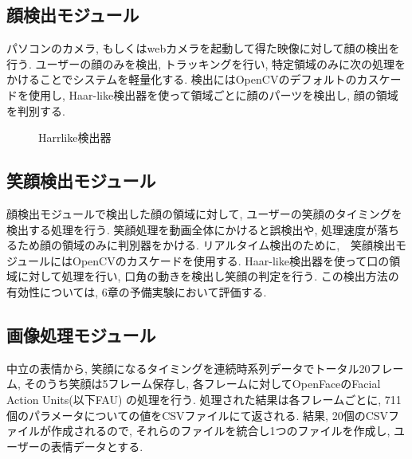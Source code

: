\subsection{顔検出モジュール}
パソコンのカメラ, もしくはwebカメラを起動して得た映像に対して顔の検出を行う.
ユーザーの顔のみを検出, トラッキングを行い, 特定領域のみに次の処理をかけることでシステムを軽量化する.
検出にはOpenCVのデフォルトのカスケードを使用し, Haar-like検出器を使って領域ごとに顔のパーツを検出し,
顔の領域を判別する.

\begin{figure}[htbp]
    \begin{center}
    \end{center}
    \caption{Harr\-like検出器}
    \label{fig:haarlikedetector}
\end{figure}

\subsection{笑顔検出モジュール}
顔検出モジュールで検出した顔の領域に対して, ユーザーの笑顔のタイミングを検出する処理を行う.
笑顔処理を動画全体にかけると誤検出や,  処理速度が落ちるため顔の領域のみに判別器をかける.
リアルタイム検出のために,　笑顔検出モジュールにはOpenCVのカスケードを使用する.
Haar-like検出器を使って口の領域に対して処理を行い, 口角の動きを検出し笑顔の判定を行う.
この検出方法の有効性については, 6章の予備実験において評価する.

\subsection{画像処理モジュール}
中立の表情から, 笑顔になるタイミングを連続時系列データでトータル20フレーム, そのうち笑顔は5フレーム保存し,
各フレームに対してOpenFaceのFacial Action Units(以下FAU) の処理を行う.
処理された結果は各フレームごとに, 711個のパラメータについての値をCSVファイルにて返される.
結果, 20個のCSVファイルが作成されるので, それらのファイルを統合し1つのファイルを作成し,
ユーザーの表情データとする.

